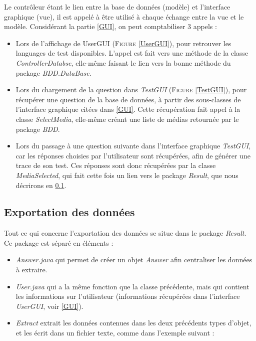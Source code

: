 Le contrôleur étant le lien entre la base de données (modèle) et l'interface graphique (vue), il est appelé à être utilisé à chaque échange entre la vue et le modèle.
Considérant la partie \ref{GUI}, on peut comptabiliser 3 appels :

\begin{itemize}
 \item Lors de l'affichage de UserGUI (\textsc{Figure} \ref{UserGUI}), pour retrouver les languages de test disponibles. L'appel est fait vers une méthode de la classe \textit{ControllerDatabse}, elle-même faisant le lien vers la bonne méthode du package \textit{BDD.DataBase}.
 \item Lors du chargement de la question dans \textit{TestGUI} (\textsc{Figure} \ref{TestGUI}), pour récupérer une question de la base de données, à partir des sous-classes de l'interface graphique citées dans \ref{GUI}. Cette récupération fait appel à la classe \textit{SelectMedia}, elle-même créant une liste de médias retournée par le package \textit{BDD}.
 \item Lors du passage à une question suivante dans l'interface graphique \textit{TestGUI}, car les réponses choisies par l'utilisateur sont récupérées, afin de générer une trace de son test. Ces réponses sont donc récupérées par la classe \textit{MediaSelected}, qui fait cette fois un lien vers le package \textit{Result}, que nous décrirons en \ref{export}.
\end{itemize}


\subsection{Exportation des données}\label{export}

Tout ce qui concerne l'exportation des données se situe dans le package \textit{Result}. Ce package est séparé en 
 éléments :
 
 \begin{itemize}
  \item \textit{Answer.java} qui permet de créer un objet \textit{Answer} afin centraliser les données à extraire.
  \item \textit{User.java} qui a la même fonction que la classe précédente, mais qui contient les informations sur l'utilisateur (informations récupérées dans l'interface \textit{UserGUI}, voir \ref{GUI}).
  \item \textit{Extract} extrait les données contenues dans les deux précédents types d'objet, et les écrit dans un fichier texte, comme dans l'exemple suivant :
 \end{itemize}
 
